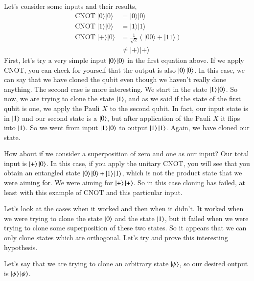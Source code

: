 Let's consider some inputs and their results,
\begin{equation}
\begin{aligned}
\operatorname{CNOT} |0\rangle|0\rangle &=|0\rangle|0\rangle \\
\operatorname{CNOT} |1\rangle|0\rangle &=|1\rangle|1\rangle \\
\operatorname{CNOT} |+\rangle|0\rangle &=\frac{1}{\sqrt{2}}(|00\rangle+|11\rangle) \\
& \neq|+\rangle|+\rangle
\end{aligned}
\end{equation}
First, let's try a very simple input $\left| 0 \right\rangle\left| 0 \right\rangle$ in the first equation above. If we apply CNOT, you can check for yourself that the output is also $\left| 0 \right\rangle\left| 0 \right\rangle$. In this case, we can say that we have cloned the qubit even though we haven't really done anything. The second case is more interesting. We start in the state $\left| 1 \right\rangle\left| 0 \right\rangle$. So now, we are trying to clone the state $\left| 1 \right\rangle$, and as we said if the state of the first qubit is one, we apply the Pauli $X$ to the second qubit.  In fact, our input state is in $\left| 1 \right\rangle$ and our second state is a $\left| 0 \right\rangle$, but after application of the Pauli $X$ it flips into $\left| 1 \right\rangle$. So we went from input $\left| 1 \right\rangle\left| 0 \right\rangle$ to output $\left| 1 \right\rangle\left| 1 \right\rangle$. Again, we have cloned our state.

How about if we consider a superposition of zero and one as our input? Our total input is $\left| + \right\rangle\left| 0 \right\rangle$. In this case, if you apply the unitary CNOT, you will see that you obtain an entangled state $\left| 0 \right\rangle\left| 0 \right\rangle+\left| 1 \right\rangle\left| 1 \right\rangle$, which is not the product state that we were aiming for. We were aiming for $\left| + \right\rangle\left| + \right\rangle$. So in this case cloning has failed, at least with this example of CNOT and this particular input.

Let's look at the cases when it worked and then when it didn't. It worked when we were trying to clone the state $\left| 0 \right\rangle$ and the state $\left| 1 \right\rangle$, but it failed when we were trying to clone some superposition of these two states. So it appears that we can only clone states which are orthogonal. Let's try and prove this interesting hypothesis.

Let's say that we are trying to clone an arbitrary state $\left| \psi \right\rangle$, so our desired output is $\left| \psi \right\rangle\left| \psi \right\rangle$.

